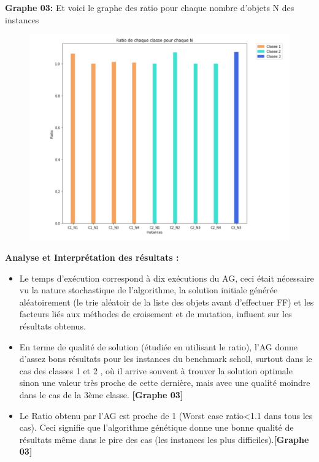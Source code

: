 \documentclass{article}
\begin{document}
\textbf{Graphe 03:}
Et voici le graphe des ratio pour chaque nombre d'objets N des instances 
\begin{figure}[H]
  \includegraphics[width=\linewidth]{../figures/pic11.PNG}
\end{figure}
\textbf{Analyse et Interprétation des résultats : }
\newline
\begin{itemize}
	\item Le temps d’exécution correspond à dix exécutions du AG, ceci était nécessaire vu la nature stochastique de l’algorithme,  la solution initiale générée aléatoirement (le trie aléatoir de la liste des objets avant d’effectuer FF) et les facteurs liés aux méthodes de croisement et de mutation, influent sur les résultats obtenus.
	\item En terme de qualité de solution (étudiée en utilisant le ratio), l'AG donne d’assez bons résultats pour les instances du benchmark scholl, surtout dans le cas des classes 1 et 2 , où il arrive souvent à trouver la solution optimale sinon une valeur très proche de cette dernière, mais avec une qualité moindre dans le cas de la 3ème classe. \textbf{[Graphe 03] }
	\item Le Ratio obtenu par l’AG est proche de 1 (Worst case ratio<1.1 dans tous les cas). Ceci signifie que l’algorithme génétique donne une bonne qualité de résultats même dans le pire des cas (les instances les plus difficiles).\textbf{[Graphe 03] }
\end{itemize}
\end{document}
